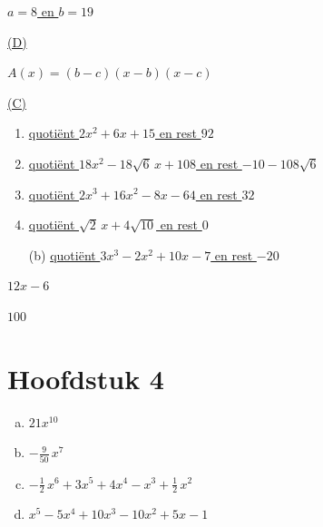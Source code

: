 \documentclass{ximera}
\begin{document}
\begin{oplossing} 
\hyperlink{oef3.10}{$a = 8$ en $b = 19$}
\end{oplossing} 

\begin{oplossing} 
\hyperlink{oef3.11}{(D)}
\end{oplossing} 

\begin{oplossing} 
\hyperlink{oef3.12}{$A(x) = (b-c)(x-b)(x-c)$}
\end{oplossing} 

\begin{oplossing} 
\hyperlink{oef3.13}{(C)}
\end{oplossing} 

\begin{oplossing} 
\begin{enumerate}
\item
\hyperlink{oef3.14}{quoti\"ent $2x^2+6x+15$ en rest $92$}
\item
\hyperlink{oef3.14}{quoti\"ent $18x^2 - 18\sqrt{6}\,x+108$ en rest $-10-108\sqrt{6}$}
\item
\hyperlink{oef3.14}{quoti\"ent $2x^3+16x^2-8x-64$ en rest $32$}
\item
\hyperlink{oef3.14}{quoti\"ent $\sqrt{2}\,x+4\sqrt{10}$ en rest $0$}
\end{enumerate}
\end{oplossing} 

\begin{oplossing} 
\begin{enumerate}
\item[(b)]
\hyperlink{oef3.15}{quoti\"ent $3x^3-2x^2+10x-7$ en rest $-20$}
\end{enumerate}
\end{oplossing} 

\begin{oplossing} 
\hyperlink{oef3.16}{$12x-6$}
\setcounter{enumi}{19}
\end{oplossing} 

\begin{oplossing} 
\hyperlink{oef3.20}{$100$}
\setcounter{enumi}{0}
\end{oplossing} 

\section*{Hoofdstuk 4}

\begin{oplossing} 
\begin{enumerate}[(a)]
\item
\hyperlink{oef4.1}{$21x^{10}$}
\item
\hyperlink{oef4.1}{$-\frac{9}{50}\,x^7$}
\item
\hyperlink{oef4.1}{$-\frac{1}{2}\,x^6 + 3x^5 + 4x^4 - x^3 + \frac{1}{2}\,x^2$}
\item
\hyperlink{oef4.1}{$x^5 - 5x^4 + 10x^3 - 10x^2 + 5x - 1$}
\end{enumerate}
\end{oplossing} 
\end{document}
